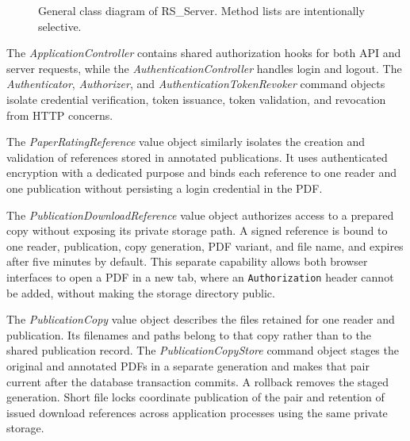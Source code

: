\documentclass[a4paper, english]{article}
\newcommand{\rsserver}{RS\_Server\xspace}
\begin{document}
\begin{figure}[!tbp]
{%
}
\caption{General class diagram of \rsserver. Method lists are intentionally selective.}
\label{fig:class-1}
\end{figure}

The \emph{ApplicationController} contains shared authorization hooks for both API and server requests, while the \emph{AuthenticationController} handles login and logout. The \emph{Authenticator}, \emph{Authorizer}, and \emph{AuthenticationTokenRevoker} command objects isolate credential verification, token issuance, token validation, and revocation from HTTP concerns.

The \emph{PaperRatingReference} value object similarly isolates the creation and validation of references stored in annotated publications. It uses authenticated encryption with a dedicated purpose and binds each reference to one reader and one publication without persisting a login credential in the PDF.

\begin{samepage}
The \emph{PublicationDownloadReference} value object authorizes access to a prepared copy without exposing its private storage path. A signed reference is bound to one reader, publication, copy generation, PDF variant, and file name, and expires after five minutes by default. This separate capability allows both browser interfaces to open a PDF in a new tab, where an \verb|Authorization| header cannot be added, without making the storage directory public.

\end{samepage}

The \emph{PublicationCopy} value object describes the files retained for one reader and publication. Its filenames and paths belong to that copy rather than to the shared publication record. The \emph{PublicationCopyStore} command object stages the original and annotated PDFs in a separate generation and makes that pair current after the database transaction commits. A rollback removes the staged generation. Short file locks coordinate publication of the pair and retention of issued download references across application processes using the same private storage.
\end{document}
